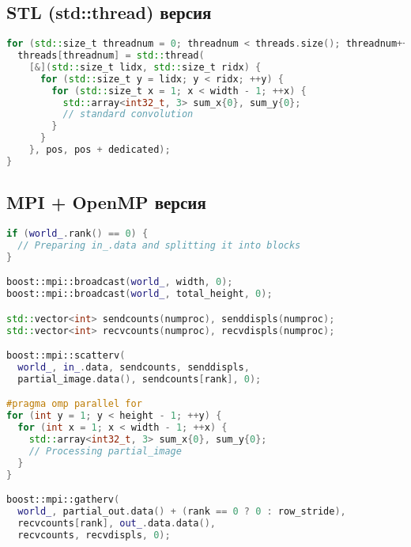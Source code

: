 \documentclass[14pt,a4paper]{extarticle}
\begin{document}
\subsection{STL (std::thread) версия}
\begin{lstlisting}[language=C++]
for (std::size_t threadnum = 0; threadnum < threads.size(); threadnum++) {
  threads[threadnum] = std::thread(
    [&](std::size_t lidx, std::size_t ridx) {
      for (std::size_t y = lidx; y < ridx; ++y) {
        for (std::size_t x = 1; x < width - 1; ++x) {
          std::array<int32_t, 3> sum_x{0}, sum_y{0};
          // standard convolution
        }
      }
    }, pos, pos + dedicated);
}
\end{lstlisting}

\newpage

\subsection{MPI + OpenMP версия}
\begin{lstlisting}[language=C++]
if (world_.rank() == 0) {
  // Preparing in_.data and splitting it into blocks
}

boost::mpi::broadcast(world_, width, 0);
boost::mpi::broadcast(world_, total_height, 0);

std::vector<int> sendcounts(numproc), senddispls(numproc);
std::vector<int> recvcounts(numproc), recvdispls(numproc);

boost::mpi::scatterv(
  world_, in_.data, sendcounts, senddispls,
  partial_image.data(), sendcounts[rank], 0);

#pragma omp parallel for
for (int y = 1; y < height - 1; ++y) {
  for (int x = 1; x < width - 1; ++x) {
    std::array<int32_t, 3> sum_x{0}, sum_y{0};
    // Processing partial_image
  }
}

boost::mpi::gatherv(
  world_, partial_out.data() + (rank == 0 ? 0 : row_stride),
  recvcounts[rank], out_.data.data(),
  recvcounts, recvdispls, 0);
\end{lstlisting}
\end{document}
